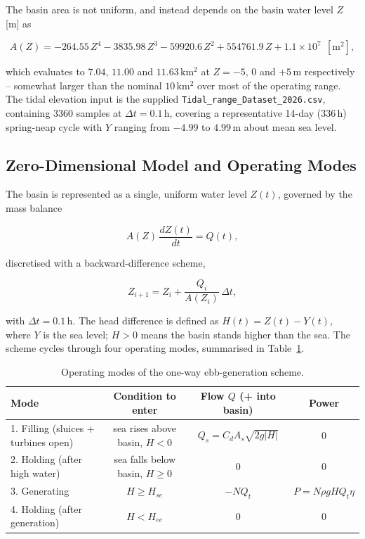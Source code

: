 The basin area is not uniform, and instead depends on the basin water level $Z$ [m] as

\begin{equation}
    A(Z) = -264.55\,Z^4 - 3835.98\,Z^3 - 59920.6\,Z^2 + 554761.9\,Z + 1.1\times10^{7}\ \ [\mathrm{m^2}],
    \label{eq:range-area}
\end{equation}

which evaluates to $7.04$, $11.00$ and $11.63\,\mathrm{km^2}$ at $Z=-5$, $0$ and $+5\,\mathrm{m}$ respectively -- somewhat larger than the nominal $10\,\mathrm{km^2}$ over most of the operating range. The tidal elevation input is the supplied \texttt{Tidal\_range\_Dataset\_2026.csv}, containing 3360 samples at $\Delta t = 0.1\,\mathrm{h}$, covering a representative 14-day ($336\,\mathrm{h}$) spring-neap cycle with $Y$ ranging from $-4.99$ to $4.99\,\mathrm{m}$ about mean sea level.

\subsection{Zero-Dimensional Model and Operating Modes}
\label{sec:range-model}
The basin is represented as a single, uniform water level $Z(t)$, governed by the mass balance

\begin{equation}
    A(Z)\,\frac{dZ(t)}{dt} = Q(t),
    \label{eq:range-massbalance}
\end{equation}

discretised with a backward-difference scheme,

\begin{equation}
    Z_{i+1} = Z_i + \frac{Q_i}{A(Z_i)}\,\Delta t,
    \label{eq:range-update}
\end{equation}

with $\Delta t = 0.1\,\mathrm{h}$. The head difference is defined as $H(t) = Z(t) - Y(t)$, where $Y$ is the sea level; $H>0$ means the basin stands higher than the sea. The scheme cycles through four operating modes, summarised in Table~\ref{tab:range-modes}.

\begin{table}[H]
    \centering
    \caption{Operating modes of the one-way ebb-generation scheme.}
    \label{tab:range-modes}
    \small
    \begin{tabular}{lccc}
        \hline
        Mode & Condition to enter & Flow $Q$ (+ into basin) & Power \\
        \hline
        1. Filling (sluices + turbines open) & sea rises above basin, $H<0$ & $Q_s = C_d A_s\sqrt{2g|H|}$ & 0 \\
        2. Holding (after high water) & sea falls below basin, $H\ge 0$ & 0 & 0 \\
        3. Generating & $H \ge H_{se}$ & $-N Q_t$ & $P = N\rho g H Q_t \eta$ \\
        4. Holding (after generation) & $H < H_{ee}$ & 0 & 0 \\
        \hline
    \end{tabular}
\end{table}

